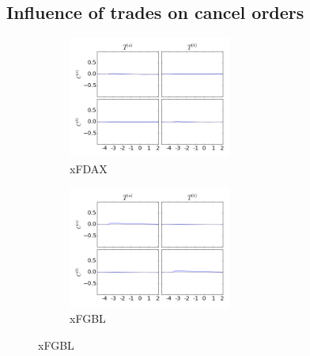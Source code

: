 \documentclass[a4paper,11pt]{article}
\begin{document}
\subsection{Influence of trades on cancel orders}
\label{TC}
\begin{figure}[H]
        \begin{subfigure}[b]{0.45\textwidth}
                \includegraphics[width=\textwidth,height=40mm]{xFDAXPA_PB_TA_TB_LA_LB_CA_CB__TATB-_CACBcausality.png}
                \caption{xFDAX}
        \end{subfigure}
        \begin{subfigure}[b]{0.45\textwidth}
                \includegraphics[width=\textwidth,height=40mm]{xFGBLPA_PB_TA_TB_LA_LB_CA_CB__TATB-_CACBcausality.png}
                \caption{xFGBL}
        \end{subfigure}
\end{figure}
\end{document}
